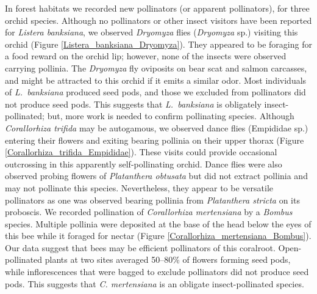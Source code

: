 \begin{multicols}{2}
In forest habitats we recorded new pollinators (or apparent
pollinators), for three orchid species. Although no pollinators or other
insect visitors have been reported for \emph{Listera banksiana}, we
observed \emph{Dryomyza} flies (\emph{Dryomyza} sp.) visiting this orchid
(Figure \ref{Listera_banksiana_Dryomyza}). They appeared to be foraging for a food reward on the orchid
lip; however, none of the insects were observed carrying pollinia. The
\emph{Dryomyza} fly oviposits on bear scat and salmon carcasses, and might be
attracted to this orchid if it emits a similar odor. Most individuals of
\emph{L.\ banksiana} produced seed pods, and those we excluded from
pollinators did not produce seed pods. This suggests that \emph{L.\
banksiana} is obligately insect-pollinated; but, more work is needed to
confirm pollinating species. Although \emph{Corallorhiza trifida} may be
autogamous, we observed dance flies (Empididae sp.) entering their
flowers and exiting bearing pollinia on their upper thorax (Figure \ref{Corallorhiza_trifida_Empididae}).
These visits could provide occasional outcrossing in this apparently
self-pollinating orchid. Dance flies were also observed probing flowers
of \emph{Platanthera obtusata} but did not extract pollinia and may not
pollinate this species. Nevertheless, they appear to be versatile
pollinators as one was observed bearing pollinia from \emph{Platanthera
stricta} on its proboscis. We recorded pollination of \emph{Corallorhiza
mertensiana} by a \emph{Bombus} species. Multiple pollinia were
deposited at the base of the head below the eyes of this bee while it
foraged for nectar (Figure \ref{Corallorhiza_mertensiana_Bombus}). Our data suggest that bees may be
efficient pollinators of this coralroot. Open-pollinated plants at two
sites averaged 50--80\% of flowers forming seed pods, while
inflorescences that were bagged to exclude pollinators did not produce
seed pods. This suggests that \emph{C. mertensiana} is an obligate
insect-pollinated species.




\end{multicols}
